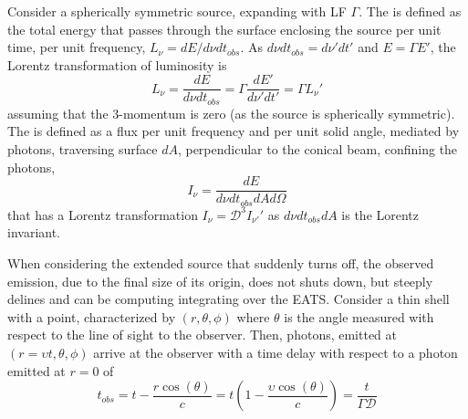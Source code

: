 Consider a spherically symmetric source, expanding with \ac{LF} $\Gamma$.
%
The  is defined as the total energy that passes 
through the surface enclosing the source per unit time, per unit frequency, 
$L_{\nu} = dE / d\nu dt_{obs}$. 
As $d\nu dt_{obs} = d\nu' dt'$ and $E=\Gamma E'$, the Lorentz transformation 
of luminosity is
%
\begin{equation}
L_{\nu} = \frac{dE}{d\nu dt_{obs}} = \Gamma \frac{dE'}{d\nu' dt'} = \Gamma L_{\nu}'
\end{equation}
%
assuming that the $3$-momentum is zero (as the source is spherically symmetric).
%
The  is defined as a flux per unit frequency 
and per unit solid angle, mediated by photons, traversing surface $dA$, 
perpendicular to the conical beam, confining the photons, 
%
\begin{equation}
I_{\nu} = \frac{dE}{d\nu dt_{obs} dA d\Omega}
\end{equation}
%
that has a Lorentz transformation $I_{\nu} = \mathcal{D}^3 I_{\nu'}'$ 
as $d\nu dt_{obs} dA$ is the Lorentz invariant.




When considering the extended source that suddenly turns off, the observed emission, 
due to the final size of its origin, does not shuts down, but steeply delines and can 
be computing integrating over the \ac{EATS}.
%
Consider a thin shell with a point, characterized by $(r,\theta,\phi)$ where $\theta$ 
is the angle measured with respect to the line of sight to the observer. Then, photons, 
emitted at $(r=\upsilon t, \theta,\phi)$ arrive at the observer with a time delay with 
respect to a photon emitted at $r=0$ of
%
\begin{equation}
t_{obs} = t - \frac{r \cos(\theta)}{c} = t(1-\frac{\upsilon\cos(\theta)}{c}) = \frac{t}{\Gamma\mathcal{D}}
\end{equation}


